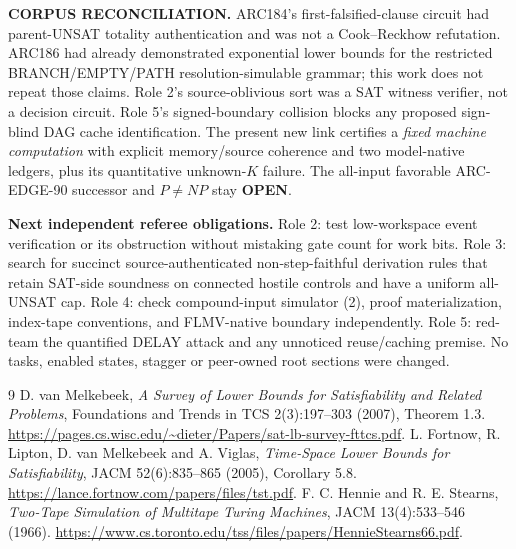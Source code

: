 \documentclass[11pt]{article}
\newcommand{\OPEN}{\textbf{OPEN}}
\begin{document}
\noindent\textbf{CORPUS RECONCILIATION.} ARC184's first-falsified-clause
circuit had parent-UNSAT totality authentication and was not a
Cook--Reckhow refutation. ARC186 had already demonstrated
exponential lower bounds for the restricted
BRANCH/EMPTY/PATH resolution-simulable grammar; this work
does not repeat those claims. Role 2's source-oblivious sort
was a SAT witness verifier, not a decision circuit. Role 5's
signed-boundary collision blocks any proposed sign-blind
DAG cache identification. The present new link certifies a
\emph{fixed machine computation} with explicit memory/source
coherence and two model-native ledgers, plus its quantitative
unknown-$K$ failure. The all-input favorable ARC-EDGE-90 successor
and $P\ne NP$ stay \OPEN{}.

\noindent\textbf{Next independent referee obligations.}
Role 2: test low-workspace event verification or its obstruction
without mistaking gate count for work bits.
Role 3: search for succinct source-authenticated non-step-faithful
derivation rules that retain SAT-side soundness on connected
hostile controls and have a uniform all-UNSAT cap.
Role 4: check compound-input simulator (2), proof materialization,
index-tape conventions, and FLMV-native boundary independently.
Role 5: red-team the quantified DELAY attack and any unnoticed
reuse/caching premise. No tasks, enabled states, stagger or
peer-owned root sections were changed.

\begin{thebibliography}{9}
 D. van Melkebeek,
\emph{A Survey of Lower Bounds for Satisfiability and Related Problems},
Foundations and Trends in TCS 2(3):197--303 (2007), Theorem 1.3.
\url{https://pages.cs.wisc.edu/~dieter/Papers/sat-lb-survey-fttcs.pdf}.
 L. Fortnow, R. Lipton, D. van Melkebeek and A. Viglas,
\emph{Time-Space Lower Bounds for Satisfiability},
JACM 52(6):835--865 (2005), Corollary 5.8.
\url{https://lance.fortnow.com/papers/files/tst.pdf}.
 F. C. Hennie and R. E. Stearns,
\emph{Two-Tape Simulation of Multitape Turing Machines},
JACM 13(4):533--546 (1966).
\url{https://www.cs.toronto.edu/tss/files/papers/HennieStearns66.pdf}.
\end{thebibliography}
\end{document}
